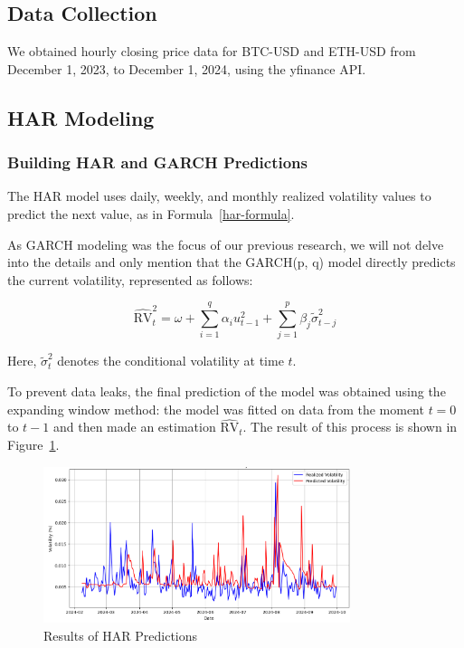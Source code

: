 \subsection{Data Collection}
We obtained hourly closing price data for BTC-USD and ETH-USD from December 1, 2023, to December 1, 2024, using the yfinance API.

\subsection{HAR Modeling}
\label{sec:return_normolize}


\subsubsection{Building HAR and GARCH Predictions}
The HAR model uses daily, weekly, and monthly realized volatility values to predict the next value, as in Formula~\ref{har-formula}.

As GARCH modeling was the focus of our previous research, we will not delve into the details and only mention that the GARCH(p, q) model directly predicts the current volatility, represented as follows:

\begin{equation}
    \widehat{\text{RV}}_t^2 = \omega + \sum_{i=1}^{q} \alpha_i u_{t-1}^2 + \sum_{j=1}^{p} \beta_j \tilde{\sigma}_{t-j}^2
\end{equation}

Here, \(\tilde{\sigma}_t^2\) denotes the conditional volatility at time \(t\).

To prevent data leaks, the final prediction of the model was obtained using the expanding window method: the model was fitted on data from the moment \(t=0\) to \(t-1\) and then made an estimation \(\widehat{\text{RV}}_t\). The result of this process is shown in Figure~\ref{fig:predictions}.

\begin{figure}[ht]
    \centering
    \includegraphics[width=0.8\textwidth]{img/realized_vs_pred.png}  %
    \caption{Results of HAR Predictions}
    \label{fig:predictions}
\end{figure}

